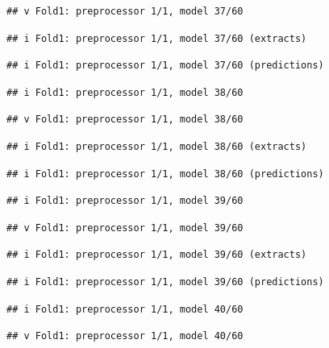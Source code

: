 \documentclass[
]{article}
\begin{document}
\begin{verbatim}
## v Fold1: preprocessor 1/1, model 37/60
\end{verbatim}

\begin{verbatim}
## i Fold1: preprocessor 1/1, model 37/60 (extracts)
\end{verbatim}

\begin{verbatim}
## i Fold1: preprocessor 1/1, model 37/60 (predictions)
\end{verbatim}

\begin{verbatim}
## i Fold1: preprocessor 1/1, model 38/60
\end{verbatim}

\begin{verbatim}
## v Fold1: preprocessor 1/1, model 38/60
\end{verbatim}

\begin{verbatim}
## i Fold1: preprocessor 1/1, model 38/60 (extracts)
\end{verbatim}

\begin{verbatim}
## i Fold1: preprocessor 1/1, model 38/60 (predictions)
\end{verbatim}

\begin{verbatim}
## i Fold1: preprocessor 1/1, model 39/60
\end{verbatim}

\begin{verbatim}
## v Fold1: preprocessor 1/1, model 39/60
\end{verbatim}

\begin{verbatim}
## i Fold1: preprocessor 1/1, model 39/60 (extracts)
\end{verbatim}

\begin{verbatim}
## i Fold1: preprocessor 1/1, model 39/60 (predictions)
\end{verbatim}

\begin{verbatim}
## i Fold1: preprocessor 1/1, model 40/60
\end{verbatim}

\begin{verbatim}
## v Fold1: preprocessor 1/1, model 40/60
\end{verbatim}
\end{document}
